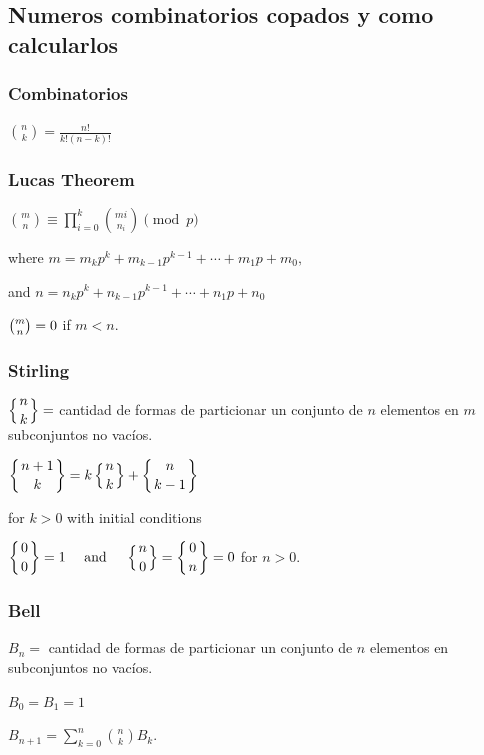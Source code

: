 \subsection{Numeros combinatorios copados y como calcularlos}
{
\subsubsection{Combinatorios}
{
\(\displaystyle \binom{n}{k} = \frac{n!}{k!(n-k)!} \)
}

\subsubsection{Lucas Theorem}
{
    \(\displaystyle {\binom {m}{n}}\equiv \prod_{i=0}^{k}{\binom {m{i}}{n_{i}}}{\pmod{p}}\)

where \({\displaystyle m=m_{k}p^{k}+m_{k-1}p^{k-1}+\cdots +m_{1}p+m_{0},}\)

and \({\displaystyle n=n_{k}p^{k}+n_{k-1}p^{k-1}+\cdots +n_{1}p+n_{0}}\)

\({\displaystyle {\tbinom {m}{n}}=0}\) if \(m < n\).


}
\subsubsection{Stirling}
{
\(\displaystyle \left\{{n \atop k}\right\} = \) cantidad de formas de particionar un conjunto de \(n\) elementos en \(m\) subconjuntos no vacíos.

\(\displaystyle \left\{{n+1\atop k}\right\} = k \left\{{ n \atop k }\right\} + \left\{{n\atop k-1}\right\}\)

for \(k > 0\) with initial conditions

\({\displaystyle \left\{{0 \atop 0}\right\}=1\quad {\mbox{ and }}\quad \left\{{n \atop 0}\right\}=\left\{{0 \atop n}\right\}=0}\)
for \(n > 0\).


}
\subsubsection{Bell}
{
\( {\displaystyle B_{n}=} \) cantidad de formas de particionar un conjunto de \(n\) elementos en subconjuntos no vacíos.

\( {\displaystyle B_0= B_1 = 1} \)

\( {\displaystyle B_{n+1}=\sum_{k=0}^{n} \binom{n}{k} B_k.} \) 

}}
